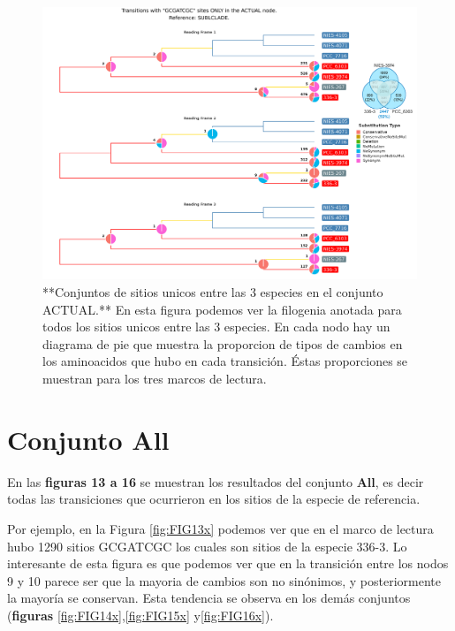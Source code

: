 \documentclass[
]{book}
\begin{document}
\begin{figure}

{\centering \includegraphics[width=1.2\linewidth]{Clados/Calothrix_B/figures/A/GCGATCGC/Actual/SUBCLADE_Actual_A_tree} 

}

\caption{**Conjuntos de sitios unicos entre las 3 especies en el conjunto ACTUAL.** En esta figura podemos ver la filogenia anotada para todos los sitios unicos entre las 3 especies. En cada nodo hay un diagrama de pie que muestra la proporcion de tipos de cambios en los aminoacidos que hubo en cada transición. Éstas proporciones se muestran para los tres marcos de lectura.}\label{fig:FIG12x}
\end{figure}

\hypertarget{conjunto-all}{%
\section{Conjunto All}\label{conjunto-all}}

En las \textbf{figuras 13 a 16} se muestran los resultados del conjunto \textbf{All}, es decir todas las transiciones que ocurrieron en los sitios de la especie de referencia.

Por ejemplo, en la Figura \ref{fig:FIG13x} podemos ver que en el marco de lectura hubo 1290 sitios GCGATCGC los cuales son sitios de la especie 336-3. Lo interesante de esta figura es que podemos ver que en la transición entre los nodos 9 y 10 parece ser que la mayoria de cambios son no sinónimos, y posteriormente la mayoría se conservan. Esta tendencia se observa en los demás conjuntos (\textbf{figuras} \ref{fig:FIG14x},\ref{fig:FIG15x} y\ref{fig:FIG16x}).
\end{document}
